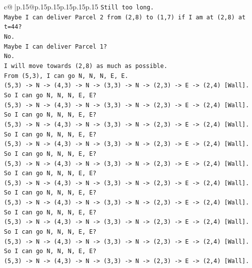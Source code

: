 \documentclass{article}
\begin{document}
{\begin{supertabular}{c@{$\;$}|p{.15\linewidth}@{}p{.15\linewidth}p{.15\linewidth}p{.15\linewidth}p{.15\linewidth}p{.15\linewidth}}
{{{\texttt{Still too long.} \\
\texttt{Maybe I can deliver Parcel 2 from (2,8) to (1,7) if I am at (2,8) at t=44?} \\
\texttt{No.} \\
\texttt{Maybe I can deliver Parcel 1?} \\
\texttt{No.} \\
\texttt{I will move towards (2,8) as much as possible.} \\
\texttt{From (5,3), I can go N, N, N, E, E.} \\
\texttt{(5,3) {-}> N {-}> (4,3) {-}> N {-}> (3,3) {-}> N {-}> (2,3) {-}> E {-}> (2,4) {[}Wall{]}.} \\
\texttt{So I can go N, N, N, E, E?} \\
\texttt{(5,3) {-}> N {-}> (4,3) {-}> N {-}> (3,3) {-}> N {-}> (2,3) {-}> E {-}> (2,4) {[}Wall{]}.} \\
\texttt{So I can go N, N, N, E, E?} \\
\texttt{(5,3) {-}> N {-}> (4,3) {-}> N {-}> (3,3) {-}> N {-}> (2,3) {-}> E {-}> (2,4) {[}Wall{]}.} \\
\texttt{So I can go N, N, N, E, E?} \\
\texttt{(5,3) {-}> N {-}> (4,3) {-}> N {-}> (3,3) {-}> N {-}> (2,3) {-}> E {-}> (2,4) {[}Wall{]}.} \\
\texttt{So I can go N, N, N, E, E?} \\
\texttt{(5,3) {-}> N {-}> (4,3) {-}> N {-}> (3,3) {-}> N {-}> (2,3) {-}> E {-}> (2,4) {[}Wall{]}.} \\
\texttt{So I can go N, N, N, E, E?} \\
\texttt{(5,3) {-}> N {-}> (4,3) {-}> N {-}> (3,3) {-}> N {-}> (2,3) {-}> E {-}> (2,4) {[}Wall{]}.} \\
\texttt{So I can go N, N, N, E, E?} \\
\texttt{(5,3) {-}> N {-}> (4,3) {-}> N {-}> (3,3) {-}> N {-}> (2,3) {-}> E {-}> (2,4) {[}Wall{]}.} \\
\texttt{So I can go N, N, N, E, E?} \\
\texttt{(5,3) {-}> N {-}> (4,3) {-}> N {-}> (3,3) {-}> N {-}> (2,3) {-}> E {-}> (2,4) {[}Wall{]}.} \\
\texttt{So I can go N, N, N, E, E?} \\
\texttt{(5,3) {-}> N {-}> (4,3) {-}> N {-}> (3,3) {-}> N {-}> (2,3) {-}> E {-}> (2,4) {[}Wall{]}.} \\
\texttt{So I can go N, N, N, E, E?} \\
\texttt{(5,3) {-}> N {-}> (4,3) {-}> N {-}> (3,3) {-}> N {-}> (2,3) {-}> E {-}> (2,4) {[}Wall{]}.} \\
}}}
\end{supertabular}}
\end{document}
